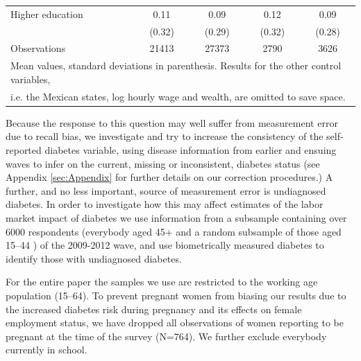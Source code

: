 \documentclass[12pt,english]{article}
\begin{document}
\begin{table}
\begin{adjustbox}{max width=0.9\textwidth, center}
{\begin{tabular}{l*{4}{c}}
Higher education    &        0.11&        0.09&        0.12&        0.09\\
                    &      (0.32)&      (0.29)&      (0.32)&      (0.28)\\
\midrule
Observations        &       21413&       27373&        2790&        3626\\
\bottomrule
\multicolumn{5}{l}{\footnotesize Mean values, standard deviations in parenthesis. Results for the other control variables,}\\
\multicolumn{5}{l}{\footnotesize i.e. the Mexican states, log hourly wage and wealth, are omitted to save space.}
\end{tabular}
}
\end{adjustbox}
\end{table}


Because the response to this question may well suffer from measurement error due to recall bias, we investigate and try to increase the consistency of the self-reported diabetes variable, using disease information from earlier and ensuing waves to infer on the current, missing or inconsistent, diabetes status (see Appendix \ref{sec:Appendix} for further details on our correction procedures.) A further, and no less important, source of measurement error is undiagnosed diabetes. In order to investigate how this may affect estimates of the labor market impact of diabetes we use information from a subsample containing over 6000 respondents (everybody aged 45+  and a random subsample of those aged 15--44 \parencite{Crimmins2015}) of the 2009-2012 wave, and use biometrically measured diabetes to identify those with undiagnosed diabetes. 

For the entire paper the samples we use are restricted to the working age population (15--64). To prevent pregnant women from biasing our results due to the increased diabetes risk during pregnancy and its effects on female employment status, we have dropped all observations of women reporting to be pregnant at the time of the survey (N=764). We further exclude everybody currently in school.
\end{document}

